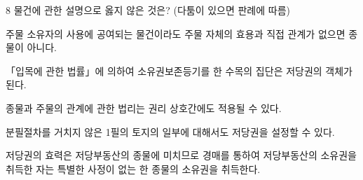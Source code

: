 \begin{question}{8}
물건에 관한 설명으로 옳지 않은 것은? (다툼이 있으면 판례에 따름)
\begin{choices}
  \item 주물 소유자의 사용에 공여되는 물건이라도 주물 자체의 효용과 직접 관계가 없으면 종물이 아니다.
  \item 「입목에 관한 법률」에 의하여 소유권보존등기를 한 수목의 집단은 저당권의 객체가 된다.
  \item 종물과 주물의 관계에 관한 법리는 권리 상호간에도 적용될 수 있다.
  \item 분필절차를 거치지 않은 1필의 토지의 일부에 대해서도 저당권을 설정할 수 있다.
  \item 저당권의 효력은 저당부동산의 종물에 미치므로 경매를 통하여 저당부동산의 소유권을 취득한 자는 특별한 사정이 없는 한 종물의 소유권을 취득한다.
\end{choices}
\end{question}
